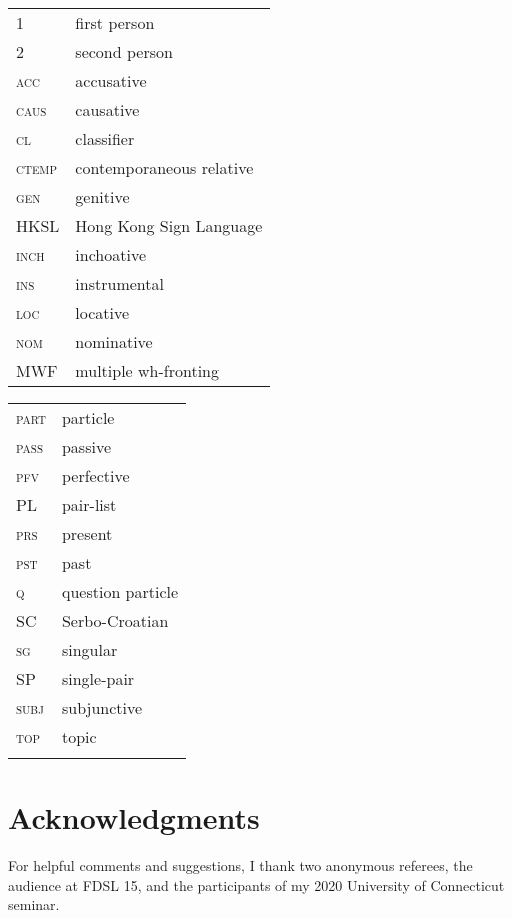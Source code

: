 \documentclass[output=paper,colorlinks,citecolor=brown]{langscibook}
\begin{document}
\begin{tabularx}{.5\textwidth}{@{}lQ}
\textsc{1}& first person\\
\textsc{2}& second person\\
\textsc{acc}& accusative\\
\textsc{caus}& causative\\
\textsc{cl}& classifier\\
\textsc{ctemp}& contemporaneous relative\\
\textsc{gen}& genitive\\
\textsc{HKSL}& Hong Kong Sign Language\\
\textsc{inch}& inchoative\\
\textsc{ins}& instrumental\\
\textsc{loc}& locative\\
\textsc{nom}& nominative\\
\textsc{MWF}& multiple wh-fronting\\
\end{tabularx}%
\begin{tabularx}{.5\textwidth}{XQ@{}}
\textsc{part}& particle\\
\textsc{pass}& passive\\
\textsc{pfv}& perfective\\
\textsc{PL}& pair-list\\
\textsc{prs}& present\\
\textsc{pst}& past \\
\textsc{q}& question particle\\
\textsc{SC}& Serbo-Croatian\\
\textsc{sg}& singular\\
\textsc{SP}& single-pair\\
\textsc{subj}&subjunctive\\
\textsc{top}& topic\\
&\\ %
\end{tabularx}

\section*{Acknowledgments}

For helpful comments and suggestions, I thank two anonymous referees, the audience at FDSL 15, and the participants of my 2020 University of Connecticut seminar.

\printbibliography[heading=subbibliography,notkeyword=this]
\end{document}
